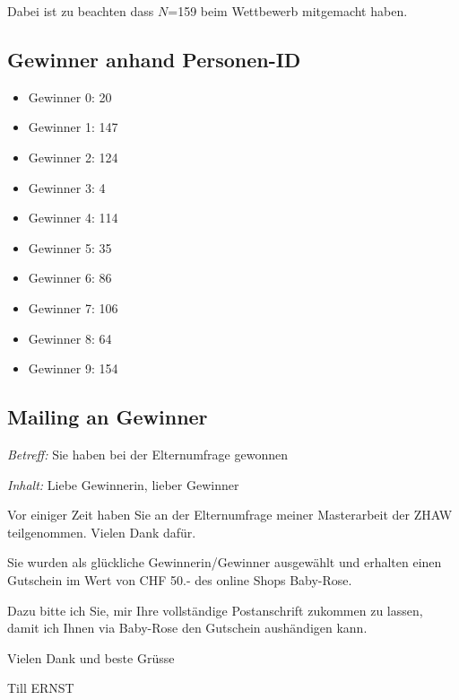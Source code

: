 Dabei ist zu beachten dass $N$=159 beim Wettbewerb mitgemacht haben.

\subsection*{Gewinner anhand Personen-ID}
\begin{itemize}
    \item Gewinner 0: 20
    \item Gewinner 1: 147
    \item Gewinner 2: 124
    \item Gewinner 3: 4
    \item Gewinner 4: 114
    \item Gewinner 5: 35
    \item Gewinner 6: 86
    \item Gewinner 7: 106
    \item Gewinner 8: 64
    \item Gewinner 9: 154
\end{itemize}

\subsection*{Mailing an Gewinner}
\begin{flushleft}
\textit{Betreff:}
Sie haben bei der Elternumfrage gewonnen

\textit{Inhalt:}
Liebe Gewinnerin, lieber Gewinner

Vor einiger Zeit haben Sie an der Elternumfrage meiner Masterarbeit der ZHAW teilgenommen. Vielen Dank dafür. 

Sie wurden als glückliche Gewinnerin/Gewinner ausgewählt und erhalten einen Gutschein im Wert von CHF 50.- des online Shops Baby-Rose.

Dazu bitte ich Sie, mir Ihre vollständige Postanschrift zukommen zu lassen, damit ich Ihnen via Baby-Rose den Gutschein aushändigen kann.

Vielen Dank und beste Grüsse

Till ERNST
\end{flushleft}